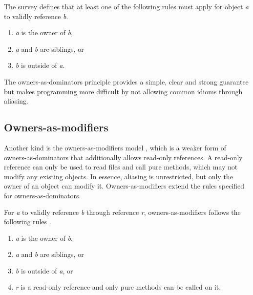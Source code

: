 \documentclass[sigplan,11pt,nonacm]{acmart}
\begin{document}
The survey \cite{ownership-types-survey} defines that at least one of the following rules must apply for object \emph{a} to validly reference \emph{b}.
\begin{enumerate}
  \item \emph{a} is the owner of \emph{b},
  \item \emph{a} and \emph{b} are siblings, or
  \item \emph{b} is outside of \emph{a}.
\end{enumerate}

The owners-as-dominators principle provides a simple, clear and strong guarantee but makes programming more difficult by not allowing common idioms through aliasing.


\subsection{Owners-as-modifiers}
\label{sec:owners-as-modifiers}

Another kind is the owners-as-modifiers model \cite{ownership-types-survey}, which is a weaker form of owners-as-dominators that additionally allows read-only references.
A read-only reference can only be used to read files and call pure methods, which may not modify any existing objects.
In essence, aliasing is unrestricted, but only the owner of an object can modify it.
Owners-as-modifiers extend the rules specified for owners-as-dominators.

For \emph{a} to validly reference \emph{b} through reference \emph{r}, owners-as-modifiers follows the following rules \cite{ownership-types-survey}.
\begin{enumerate}
  \item \emph{a} is the owner of \emph{b},
  \item \emph{a} and \emph{b} are siblings, or
  \item \emph{b} is outside of \emph{a}, or
  \item \emph{r} is a read-only reference and only pure methods can be called on it.
\end{enumerate}
\end{document}
